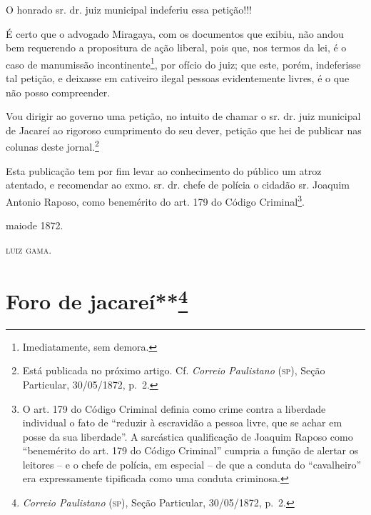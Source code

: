 {\begin{flushright}
O honrado sr. dr. juiz municipal indeferiu essa petição!!!

É certo que o advogado Miragaya, com os documentos que exibiu, não andou
bem requerendo a propositura de ação liberal, pois que, nos termos da
lei, é o caso de manumissão incontinente\footnote{ Imediatamente, sem
  demora.}, por ofício do juiz; que este, porém, indeferisse tal
petição, e deixasse em cativeiro ilegal pessoas evidentemente livres, é
o que não posso compreender.

Vou dirigir ao governo uma petição, no intuito de chamar o sr. dr. juiz
municipal de Jacareí ao rigoroso cumprimento do seu dever, petição que
hei de publicar nas colunas deste jornal.\footnote{ Está publicada no
  próximo artigo. Cf. \emph{Correio Paulistano} (\textsc{sp}), Seção Particular,
  30/05/1872, p.~2.}

Esta publicação tem por fim levar ao conhecimento do público um atroz
atentado, e recomendar ao exmo. sr. dr. chefe de polícia o cidadão sr.
Joaquim Antonio Raposo, como benemérito do art. 179 do Código
Criminal\footnote{ O art. 179 do Código Criminal definia como crime
  contra a liberdade individual o fato de ``reduzir à escravidão a pessoa
  livre, que se achar em posse da sua liberdade''. A sarcástica
  qualificação de Joaquim Raposo como ``benemérito do art. 179 do Código
  Criminal'' cumpria a função de alertar os leitores -- e o chefe de
  polícia, em especial -- de que a conduta do ``cavalheiro'' era
  expressamente tipificada como uma conduta criminosa.}.

maiode 1872.

\textsc{luiz gama}.

\chapter{Foro de jacareí**\footnote{\emph{Correio Paulistano} (\textsc{sp}), Seção Particular,
  30/05/1872, p.~2.} } %


\end{flushright}}

